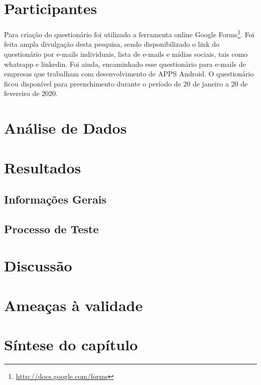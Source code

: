 \section{Participantes}

Para criação do questionário foi utilizado a ferramenta online Google Forms\footnote{\url{http://docs.google.com/forms}}. Foi feita ampla divulgação desta pesquisa, sendo disponibilizado o link do questionário por e-mails individuais, lista de e-mails e mídias sociais, tais como whatsapp e linkedin. Foi ainda, encaminhado esse questionário para e-mails de empresas que trabalham com desenvolvimento de \ac{APPS} Android. O questionário ficou disponível para preenchimento durante o período de 20 de janeiro a 20 de fevereiro de 2020.


\section{Análise de Dados}


\section{Resultados}

\subsection{Informações Gerais}

\subsection{Processo de Teste}

\section{Discussão}

\section{Ameaças à validade}

\section{Síntese do capítulo}





